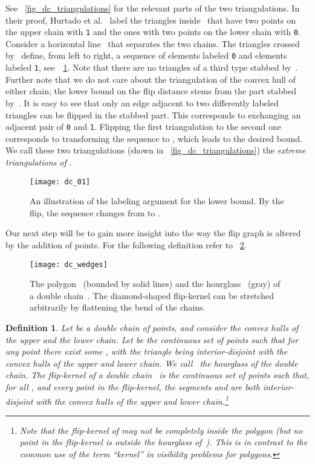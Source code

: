 \documentclass[11pt,a4paper]{article}
\newtheorem{definition}{Definition}
\begin{document}
See \figurename~\ref{fig_dc_triangulations} for the relevant parts of the two triangulations.
In their proof, Hurtado et al.~\cite{hurtado_noy_urrutia} label the triangles inside~ that have two points on the upper chain with \texttt{1} and the ones with two points on the lower chain with \texttt{0}.
Consider a horizontal line~ that separates the two chains.
The triangles crossed by~ define, from left to right, a sequence  of  elements labeled \texttt{0} and  elements labeled \texttt{1}, see~\figurename~\ref{fig_dc_01}.
Note that there are no triangles of a third type stabbed by~.
Further note that we do not care about the triangulation of the convex hull of either chain; the lower bound on the flip distance stems from the part stabbed by~.
It is easy to see that only an edge adjacent to two differently labeled triangles can be flipped in the stabbed part.
This corresponds to exchanging an adjacent pair of \texttt{0} and \texttt{1}.
Flipping the first triangulation to the second one corresponds to transforming the sequence  to , which leads to the desired bound.
We call these two triangulations (shown in \figurename~\ref{fig_dc_triangulations}) the \emph{extreme triangulations of }.

\begin{figure}
\centering
\texttt{[image: dc\_01]}
\caption{An illustration of the labeling argument for the lower bound.
By the flip, the sequence changes from  to .}
\label{fig_dc_01}
\end{figure}

Our next step will be to gain more insight into the way the flip graph is altered by the addition of points.
For the following definition refer to \figurename~\ref{fig_dc_wedges}.

\begin{figure}
\centering
\texttt{[image: dc\_wedges]}
\caption{The polygon~ (bounded by solid lines) and the hourglass~ (gray) of a double chain~. The diamond-shaped flip-kernel can be stretched arbitrarily by flattening the bend of the chains.}
\label{fig_dc_wedges}
\end{figure}

\begin{definition}\label{def_dc}
Let  be a double chain of  points, and consider the convex hulls of the upper and the lower chain.
Let  be the continuous set of points such that for any point  there exist some ,  with the triangle  being interior-disjoint with the convex hulls of the upper and lower chain.
We call~ the \emph{hourglass} of the double chain.
The \emph{flip-kernel of a double chain}~ is the continuous set of points such that, for all ,  and every point  in the flip-kernel, the segments  and  are both interior-disjoint with the convex hulls of the upper and lower chain.\footnote{Note that the flip-kernel of  may not be completely inside the polygon  (but no point in the flip-kernel is outside the hourglass of~).
This is in contrast to the common use of the term ``kernel'' in visibility problems for polygons.}
\end{definition}
\end{document}

